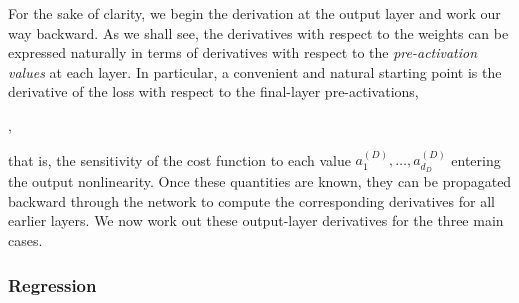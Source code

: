 For the sake of clarity, we begin the derivation at the output layer and work our way backward. As we shall see, the derivatives with respect to the weights can be expressed naturally in terms of derivatives with respect to the \emph{pre-activation values} at each layer. In particular, a convenient and natural starting point is the derivative of the loss with respect to the final-layer pre-activations,
\begin{myequation}
,
\end{myequation}
that is, the sensitivity of the cost function to each value $a_1^{(D)},\ldots,a_{d_D}^{(D)}$ entering the output nonlinearity. Once these quantities are known, they can be propagated backward through the network to compute the corresponding derivatives for all earlier layers. We now work out these output-layer derivatives for the three main cases.

\subsubsection*{Regression}

\begin{center}
\end{center}

